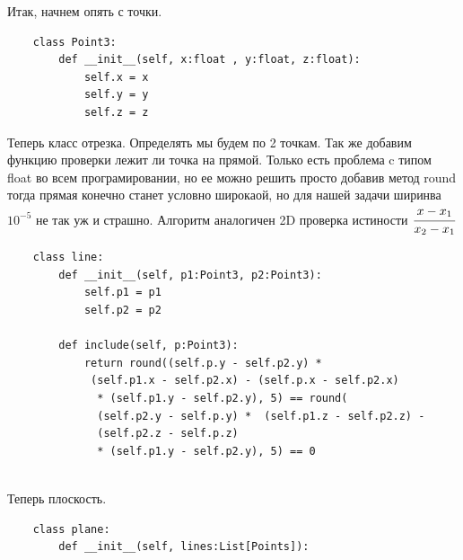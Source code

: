 \documentclass[12pt]{article} %
\begin{document}
 	\hspace*{1cm}Итак, начнем опять с точки.
 	\begin{verbatim}
 	class Point3:
 	    def __init__(self, x:float , y:float, z:float):
 	        self.x = x
 	        self.y = y
 	        self.z = z
 	\end{verbatim}
 	\hspace*{1cm}Теперь класс отрезка. Определять мы будем по 2 точкам. Так же добавим функцию проверки лежит ли точка на прямой. Только есть проблема c типом float во всем програмировании, но ее можно решить просто добавив метод round тогда прямая конечно станет условно широкаой, но для нашей задачи ширинва $10^{-5}$ не так уж и страшно. Алгоритм аналогичен 2D проверка истиности $\cfrac{x - x_1}{x_2 - x_1}$
 	\begin{verbatim}
 	class line:
 	    def __init__(self, p1:Point3, p2:Point3):
 	        self.p1 = p1
 	        self.p2 = p2
 	    
 	    def include(self, p:Point3):
 	        return round((self.p.y - self.p2.y) *
 	         (self.p1.x - self.p2.x) - (self.p.x - self.p2.x)
 	          * (self.p1.y - self.p2.y), 5) == round(
 	          (self.p2.y - self.p.y) *  (self.p1.z - self.p2.z) - 
 	          (self.p2.z - self.p.z)
 	          * (self.p1.y - self.p2.y), 5) == 0
 	       
    \end{verbatim}
    \hspace*{1cm}Теперь плоскость.
    \begin{verbatim}
    class plane:
        def __init__(self, lines:List[Points]):
            
    \end{verbatim}
 
\end{document}
